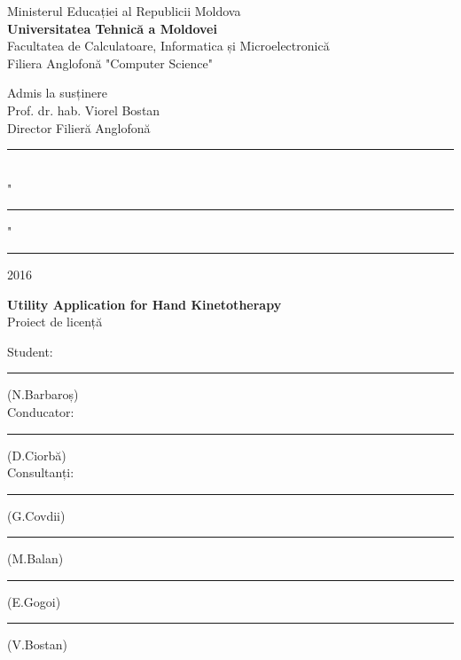 \begin{titlepage}

\newcommand{\HRule}{\rule{\linewidth}{0.5mm}} %

\center %
 

Ministerul Educației al Republicii Moldova\\ %
\textbf{Universitatea Tehnică a Moldovei}\\%
Facultatea de Calculatoare, Informatica și Microelectronică\\
Filiera Anglofonă "Computer Science"\\


\vspace{2cm}



\hfill Admis la susținere\\
\hfill Prof. dr. hab. Viorel Bostan\\
\hfill Director Filieră Anglofonă\\

\vspace{0.4cm}
\hfill \rule{5cm}{0.2mm}\\
\hfill "\rule{0.75cm}{0.2mm}" \ \rule{3cm}{0.2mm} 2016
\vspace{3cm}




\begin{center}
{\LARGE \textbf{Utility Application for Hand Kinetotherapy}}\\
\vspace{0.6cm}
Proiect de licență
\end{center}
\vspace{1cm}


\hfill Student: \rule{3.9cm}{0.2mm}(N.Barbaroș)\\
\vspace{0.2cm}
\hfill Conducator: \rule{4cm}{0.2mm}(D.Ciorbă)\\
\vspace{0.2cm}
\hfill Consultanți: \rule{4.2cm}{0.2mm}(G.Covdii)\\
\vspace{0.2cm}
\hfill \rule{4cm}{0.2mm}(M.Balan)\\
\vspace{0.2cm}
\hfill \rule{3.9cm}{0.2mm}(E.Gogoi)\\
\vspace{0.2cm}
\hfill \rule{4cm}{0.2mm}(V.Bostan)\\
\vspace{4cm}




\end{titlepage}
